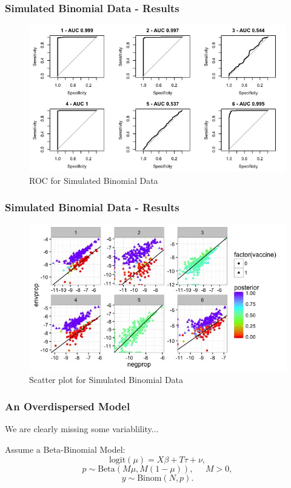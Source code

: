 \documentclass{beamer}
\theoremstyle{definition}
\begin{document}

\begin{frame}
\frametitle{Simulated Binomial Data - Results}
\begin{figure}[]
\includegraphics[width=12 cm]{figures/artificialBinomROC} \caption{ROC for Simulated Binomial Data}
\end{figure}
\end{frame}


\begin{frame}
\frametitle{Simulated Binomial Data - Results}
\begin{figure}[]
\includegraphics[width=12 cm]{figures/artificialBinomScatter} \caption{Scatter plot for Simulated Binomial Data}
\end{figure}
\end{frame}


\begin{frame}
\frametitle{An Overdispersed Model}
We are clearly missing some variablility... 
\vspace{0.3 cm}

Assume a Beta-Binomial Model:
$$
\text{logit}(\mu) = X\beta + T\tau + \nu,
$$$$
p \sim \text{Beta}(M\mu, M(1-\mu)), \;\;\;\;\; M>0,
$$$$
y \sim \text{Binom}(N, p).
$$
\end{frame}
\end{document}
